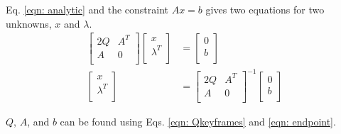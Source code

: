 \documentclass[11pt]{article}
\begin{document}
Eq. \ref{eqn: analytic} and the constraint $Ax=b$ gives two equations for two unknowns, $x$ and $\lambda$. 
\begin{align*}
\begin{bmatrix}
2Q & A^T \\
A & 0 \\
\end{bmatrix} 
\begin{bmatrix}
x \\
\lambda^T \\
\end{bmatrix} &=
\begin{bmatrix}
0 \\
b \\
\end{bmatrix} \\
\begin{bmatrix}
x \\
\lambda^T \\
\end{bmatrix} &= 
\begin{bmatrix}
2Q & A^T \\
A & 0 \\
\end{bmatrix} ^{-1} 
\begin{bmatrix}
0 \\
b \\
\end{bmatrix}
\end{align*}

$Q$, $A$, and $b$ can be found using Eqs. \ref{eqn: Qkeyframes} and \ref{eqn: endpoint}. 



%
%
\end{document}
